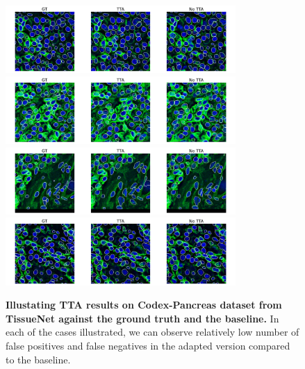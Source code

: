 \begin{figure}
    \includegraphics[width=8.75cm]{figs/1.pdf}
    \includegraphics[width=8.75cm]{figs/43.pdf}
    \includegraphics[width=8.75cm]{figs/45.pdf}
    \includegraphics[width=8.75cm]{figs/55.pdf}
    \caption{\textbf{Illustating TTA results on Codex-Pancreas dataset from TissueNet against the ground truth and the baseline.} In each of the cases illustrated, we can observe relatively low number of false positives and false negatives in the adapted version compared to the baseline.}
    \label{fig:qual}
\end{figure}

